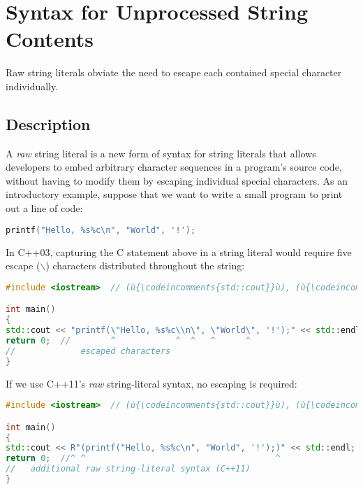 \newpage
\section[Raw String Literals '14]{Syntax for Unprocessed String Contents}\label{raw-string-literals}


Raw string literals obviate the need to escape each contained special
character individually.

\subsection[Description]{Description}\label{description}

A \emph{raw} string literal is a new form of syntax for string literals
that allows developers to embed arbitrary character sequences in a
program's source code, without having to modify them by escaping
individual special characters. As an introductory example, suppose that
we want to write a small program to print out a line of code:

\begin{lstlisting}[language=C++]
printf("Hello, %s%c\n", "World", '!');
\end{lstlisting}

\noindent In C++03, capturing the C statement above in a string literal would
require five escape (\texttt{$\backslash$}) characters distributed
throughout the string:

\begin{lstlisting}[language=C++]
#include <iostream>  // (ù{\codeincomments{std::cout}}ù), (ù{\codeincomments{std::endl}}ù)

int main()
{
std::cout << "printf(\"Hello, %s%c\\n\", \"World\", '!');" << std::endl;
return 0;  //        ^            ^  ^   ^      ^
//             escaped characters
}
\end{lstlisting}

\noindent If we use C++11's \emph{raw} string-literal syntax, no escaping is
required:

\begin{lstlisting}[language=C++]
#include <iostream>  // (ù{\codeincomments{std::cout}}ù), (ù{\codeincomments{std::endl}}ù)

int main()
{
std::cout << R"(printf("Hello, %s%c\n", "World", '!');)" << std::endl;
return 0;  //^ ^                                      ^
//   additional raw string-literal syntax (C++11)
}
\end{lstlisting}

